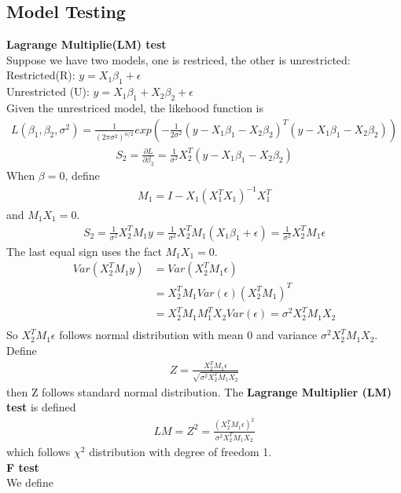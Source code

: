 \documentclass[a4paper]{article}
\begin{document}
\subsection{Model Testing}
{\bf Lagrange Multiplie(LM) test}\\
Suppose we have two models, one is restriced, the other is unrestricted:
Restricted(R): $y = X_1 \beta_1 + \epsilon$\\
Unrestricted (U): $y = X_1 \beta_1 + X_2 \beta_2 + \epsilon$\\
Given the unrestriced model, the likehood function is 
\begin{align*}
L(\beta_1, \beta_2, \sigma^2) = \frac{1}{(2\pi \sigma^2)^{n/2}}exp(-\frac{1}{2\sigma^2}(y-X_1\beta_1-X_2\beta_2)^T(y-X_1\beta_1-X_2\beta_2))
\end{align*}
\begin{align*}
S_2 = \frac{\partial L}{\partial \beta_2} =\frac{1}{\sigma^2}X_2^T(y - X_1\beta_1-X_2\beta_2)
\end{align*}
When $\beta=0$, define
\begin{align*}
M_1 = I - X_1(X^T_1X_1)^{-1}X^T_1
\end{align*}
and $M_1X_1=0$.
\begin{align*}
S_2 =\frac{1}{\sigma^2}X_2^TM_1y = \frac{1}{\sigma^2}X_2^TM_1(X_1 \beta_1 + \epsilon) = \frac{1}{\sigma^2}X_2^TM_1 \epsilon
\end{align*}
The last equal sign uses the fact $M_1X_1 = 0$.
\begin{align*}
 Var(X_2^TM_1y) & = Var(X_2^TM_1 \epsilon) \\
             & =  X_2^TM_1Var(\epsilon)(X_2^TM_1)^T \\
             & =  X_2^TM_1 M_1^T X_2Var(\epsilon) = \sigma^2  X_2^TM_1X_2 \\
\end{align*}
So $X_2^TM_1\epsilon$ follows normal distribution with mean 0 and variance $\sigma^2X_2^TM_1X_2$. Define
\begin{align*}
Z=\frac{X_2^TM_1\epsilon}{\sqrt{\sigma^2X_2^TM_1X_2}}
\end{align*}
then Z follows standard normal distribution. The {\bf Lagrange Multiplier (LM) test} is defined
\begin{align*}
LM =  Z^2  = \frac{(X_2^TM_1\epsilon)^2}{\sigma^2X_2^TM_1X_2} 
\end{align*}
which follows $\chi^2$ distribution with degree of freedom 1.\\
{\bf F test}\\
We define
\end{document}
